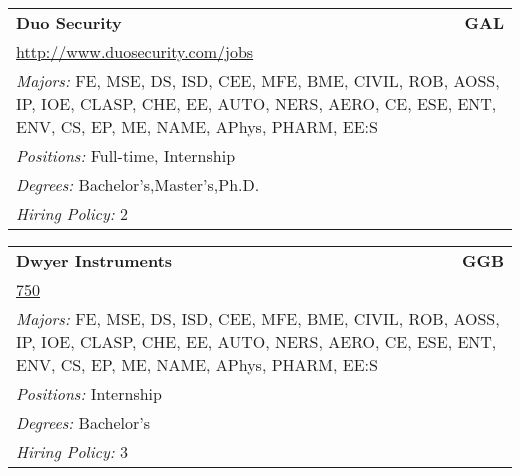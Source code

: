 \documentclass[twoside]{article}
\begin{document}
\begin{center}
\begin{multicols}{3}
\begin{FlushLeft}
\begin{minipage}{.9\columnwidth}
\end{minipage}
 
\begin{minipage}{.9\columnwidth}\begin{tabularx}{.95\columnwidth}{Xr}
                 {\Large\bf Duo Security} & {\Large\bf GAL}\\
    \multicolumn{2}{p{.95\columnwidth}}{\url{http://www.duosecurity.com/jobs}}\\
    \multicolumn{2}{p{.95\columnwidth}}{\emph{Majors:} FE, MSE, DS, ISD, CEE, MFE, BME, CIVIL, ROB, AOSS, IP, IOE, CLASP, CHE, EE, AUTO, NERS, AERO, CE, ESE, ENT, ENV, CS, EP, ME, NAME, APhys, PHARM, EE:S}\\
    \multicolumn{2}{p{.95\columnwidth}}{\emph{Positions:} Full-time, Internship}\\
    \multicolumn{2}{p{.95\columnwidth}}{\emph{Degrees:} Bachelor's,Master's,Ph.D.}\\
    \multicolumn{2}{p{.95\columnwidth}}{\emph{Hiring Policy:} 2}\\
    \end{tabularx}
    
\end{minipage}
 
\begin{minipage}{.9\columnwidth}\begin{tabularx}{.95\columnwidth}{Xr}
                 {\Large\bf Dwyer Instruments} & {\Large\bf GGB}\\
    \multicolumn{2}{p{.95\columnwidth}}{\url{750}}\\
    \multicolumn{2}{p{.95\columnwidth}}{\emph{Majors:} FE, MSE, DS, ISD, CEE, MFE, BME, CIVIL, ROB, AOSS, IP, IOE, CLASP, CHE, EE, AUTO, NERS, AERO, CE, ESE, ENT, ENV, CS, EP, ME, NAME, APhys, PHARM, EE:S}\\
    \multicolumn{2}{p{.95\columnwidth}}{\emph{Positions:} Internship}\\
    \multicolumn{2}{p{.95\columnwidth}}{\emph{Degrees:} Bachelor's}\\
    \multicolumn{2}{p{.95\columnwidth}}{\emph{Hiring Policy:} 3}\\
    \end{tabularx}
    
\end{minipage}
 

\end{FlushLeft}
\end{multicols}
\end{center}
\end{document}
